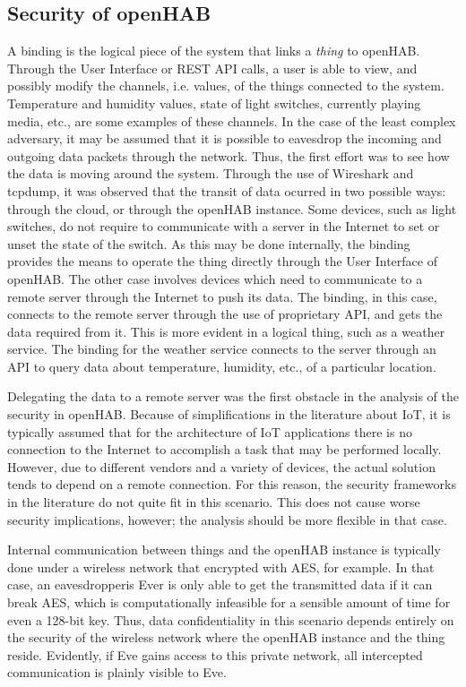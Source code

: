 \documentclass[12pt]{article}
\newcommand{\TODO}{\todo[inline]}
\begin{document}
\subsection{Security of openHAB}
\TODO{Analysis of bindings}
A binding is the logical piece of the system that links a \emph{thing} to openHAB. Through the User Interface or REST API calls, a user is able to view, and possibly modify the channels, i.e. values, of the things connected to the system. Temperature and humidity values, state of light switches, currently playing media, etc., are some examples of these channels. In the case of the least complex adversary, it may be assumed that it is possible to eavesdrop the incoming and outgoing data packets through the network. Thus, the first effort was to see how the data is moving around the system. Through the use of Wireshark and tcpdump, it was observed that the transit of data ocurred in two possible ways: through the cloud, or through the openHAB instance. Some devices, such as light switches, do not require to communicate with a server in the Internet to set or unset the state of the switch. As this may be done internally, the binding provides the means to operate the thing directly through the User Interface of openHAB. The other case involves devices which need to communicate to a remote server through the Internet to push its data. The binding, in this case, connects to the remote server through the use of proprietary API, and gets the data required from it. This is more evident in a logical thing, such as a weather service. The binding for the weather service connects to the server through an API to query data about temperature, humidity, etc., of a particular location.

Delegating the data to a remote server was the first obstacle in the analysis of the security in openHAB. Because of simplifications in the literature about IoT, it is typically assumed that for the architecture of IoT applications \TODO{REFERENCE} there is no connection to the Internet to accomplish a task that may be performed locally. However, due to different vendors and a variety of devices, the actual solution tends to depend on a remote connection. For this reason, the security frameworks \TODO{reference} in the literature do not quite fit in this scenario. This does not cause worse security implications, however; the analysis should be more flexible in that case.

Internal communication between things and the openHAB instance is typically done under a wireless network that encrypted with AES, for example. In that case, an eavesdropperis Ever is only able to get the transmitted data if it can break AES, which is computationally infeasible for a sensible amount of time for even a 128-bit key. Thus, data confidentiality in this scenario depends entirely on the security of the wireless network where the openHAB instance and the thing reside. Evidently, if Eve gains access to this private network, all intercepted communication is plainly visible to Eve.
\end{document}
